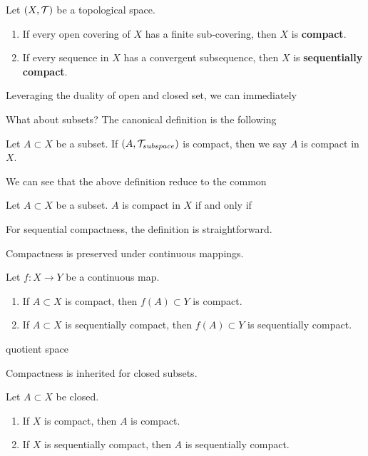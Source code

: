 \begin{definition}
    Let $(X,\mathcal{T})$ be a topological space.
    \begin{enumerate}[label=(\roman*)]
        \item If every open covering of $X$ has a finite sub-covering, then $X$ is \textbf{compact}.
        \item If every sequence in $X$ has a convergent subsequence, then $X$ is \textbf{sequentially compact}.
    \end{enumerate}
    
\end{definition}
Leveraging the duality of open and closed set, we can immediately


What about subsets? The canonical definition is the following
\begin{remark}
    Let $A\subset X$ be a subset. If $(A,\mathcal{T}_{subspace})$ is compact, then we say $A$ is compact in $X$.
\end{remark}
We can see that the above definition reduce to the common 
\begin{proposition}
    Let $A\subset X$ be a subset. $A$ is compact in $X$ if and only if 
\end{proposition}
For sequential compactness, the definition is straightforward.


Compactness is preserved under continuous mappings.
\begin{theorem}
    Let $f:X\to Y$ be a continuous map.
    \begin{enumerate}[label=(\roman*)]
        \item If $A\subset X$ is compact, then $f(A)\subset Y$ is compact.
        \item If $A\subset X$ is sequentially compact, then $f(A)\subset Y$ is sequentially compact.
    \end{enumerate}
\end{theorem}
\begin{corollary}
    quotient space
\end{corollary}

Compactness is inherited for closed subsets.
\begin{theorem}
    Let $A\subset X$ be closed.
    \begin{enumerate}[label=(\roman*)]
        \item If $X$ is compact, then $A$ is compact.
        \item If $X$ is sequentially compact, then $A$ is sequentially compact.
    \end{enumerate}
\end{theorem}


